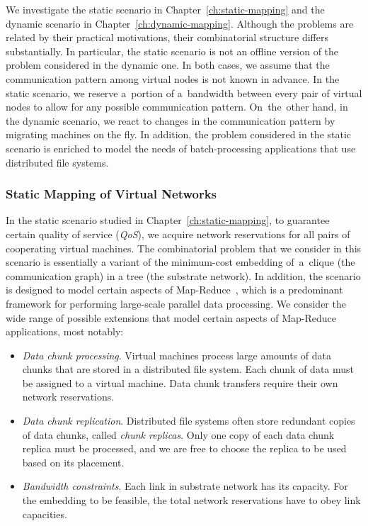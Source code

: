 We investigate the static scenario in Chapter~\ref{ch:static-mapping} and the dynamic scenario in Chapter~\ref{ch:dynamic-mapping}.
Although the problems are related by their practical motivations, their combinatorial structure differs substantially.
In particular, the static scenario is not an offline version of the problem considered in the dynamic one.
In both cases, we assume that the communication pattern among virtual nodes is not known in advance.
In the static scenario, we reserve a~portion of a~bandwidth between every pair of virtual nodes to allow for any possible communication pattern.
On~the~other hand, in the dynamic scenario, we react to changes in the communication pattern by migrating machines on the fly.
In addition, the problem considered in the static scenario is enriched to model the needs of batch-processing applications that use distributed file systems.


\subsubsection{Static Mapping of Virtual Networks}
\label{sec:contributions-static-mapping}

In the static scenario studied in Chapter~\ref{ch:static-mapping}, to guarantee certain quality of service (\emph{QoS}), we acquire network reservations for all pairs of cooperating virtual machines.
The combinatorial problem that we consider in this scenario is essentially a variant of the minimum-cost embedding of~a~clique (the communication graph) in a tree (the substrate network).
In addition, the scenario is designed to model certain aspects of Map-Reduce~\cite{mapreduce}, which is a predominant framework for performing large-scale parallel data processing.
We consider the wide range of possible extensions that model certain aspects of Map-Reduce applications, most notably:

\begin{itemize}
\item \emph{Data chunk processing}. Virtual machines process large amo\-unts of data chunks that are stored in a distributed file system. Each chunk of data must be assigned to a virtual machine. Data chunk transfers require their own network reservations.

\item \emph{Data chunk replication}. Distributed file systems often store redundant copies of data chunks, called \emph{chunk replicas}. Only one copy of each data chunk replica must be processed, and we are free to choose the replica to be used based on its placement.

\item \emph{Bandwidth constraints}. Each link in substrate network has its capacity. For the embedding to be feasible, the total network reservations have to obey link capacities.
\end{itemize}


